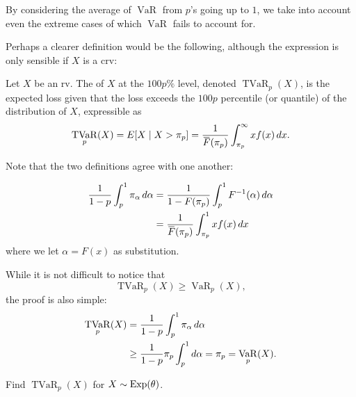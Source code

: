 \documentclass[notoc,notitlepage]{tufte-book}
\DeclareMathOperator{\VaR}{VaR}
\DeclareMathOperator{\TVaR}{TVaR}
\begin{document}
\begin{remark}
  By considering the average of $\VaR$ from $p$'s going up to $1$, we take into account even the extreme cases of which $\VaR$ fails to account for.
\end{remark}

Perhaps a clearer definition would be the following, although the expression is only sensible if $X$ is a crv:

\begin{defn}
\label{defn:tail_value_at_risk_v2}
  Let $X$ be an rv. The  of $X$ at the $100p\%$ level, denoted $\TVaR_p(X)$, is the expected loss given that the loss exceeds the $100p$ percentile (or quantile) of the distribution of $X$, expressible as
  \begin{equation*}
    \TVaR_p(X) = E[ X \mid X > \pi_p ] = \frac{1}{\bar{F}(\pi_p)} \int_{\pi_p}^{\infty} x f(x) \dif{x}.
  \end{equation*}
\end{defn}

Note that the two definitions agree with one another:

\begin{align*}
  \frac{1}{1 - p} \int_{p}^{1} \pi_\alpha \dif{\alpha} &= \frac{1}{1 - F(\pi_p)} \int_{p}^{1} F^{-1}(\alpha) \dif{\alpha} \\
                                                       &= \frac{1}{\bar{F}(\pi_p)} \int_{\pi_p}^{1} x f(x) \dif{x}
\end{align*}
where we let $\alpha = F(x)$ as substitution.

\begin{note}
  While it is not difficult to notice that
  \begin{equation*}
    \TVaR_p(X) \geq \VaR_p(X),
  \end{equation*}
  the proof is also simple:
  \begin{align*}
    \TVaR_p(X) &= \frac{1}{1 - p} \int_{p}^{1} \pi_\alpha \dif{\alpha} \\
               &\geq \frac{1}{1 - p} \pi_p \int_{p}^{1} \dif{\alpha} = \pi_p = \VaR_p(X).
  \end{align*}
\end{note}

\begin{eg}
  Find $\TVaR_p(X)$ for $X \sim \operatorname{Exp}(\theta)$.
\end{eg}
\end{document}
